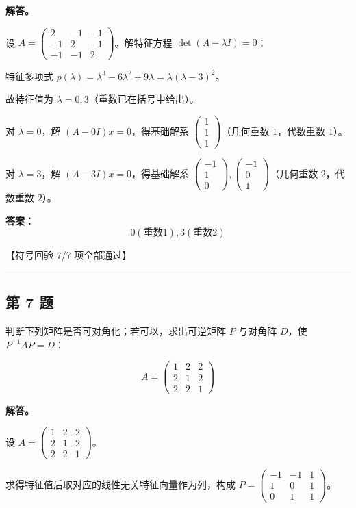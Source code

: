\documentclass[12pt, a4paper]{article}
\newcommand{\problem}[1]{\subsection*{第 #1 题}}
\newcommand{\solution}{\textbf{解答。}}
\begin{document}
\solution

设 $A = \begin{pmatrix} 2 & -1 & -1 \\ -1 & 2 & -1 \\ -1 & -1 & 2 \end{pmatrix}$。解特征方程 $\det(A - \lambda I) = 0$：

特征多项式 $p(\lambda) = \lambda^{3} - 6 \lambda^{2} + 9 \lambda = \lambda \left(\lambda - 3\right)^{2}$。

故特征值为 $\lambda = 0, 3$（重数已在括号中给出）。

对 $\lambda = 0$，解 $(A - 0I)x = 0$，得基础解系 $\begin{pmatrix} 1 \\ 1 \\ 1 \end{pmatrix}$（几何重数 $1$，代数重数 $1$）。

对 $\lambda = 3$，解 $(A - 3I)x = 0$，得基础解系 $\begin{pmatrix} -1 \\ 1 \\ 0 \end{pmatrix}, \begin{pmatrix} -1 \\ 0 \\ 1 \end{pmatrix}$（几何重数 $2$，代数重数 $2$）。

\textbf{答案：}
\[\boxed{0(重数1), 3(重数2)}\]

\textcolor{okgreen}{【符号回验 7/7 项全部通过】}

\vspace{0.8em}
\hrule
\vspace{0.8em}

\problem{7}

判断下列矩阵是否可对角化；若可以，求出可逆矩阵 $P$ 与对角阵 $D$，使 $P^{-1}AP = D$：

$$
A = \begin{pmatrix} 1 & 2 & 2 \\ 2 & 1 & 2 \\ 2 & 2 & 1 \end{pmatrix}
$$

\solution

设 $A = \begin{pmatrix} 1 & 2 & 2 \\ 2 & 1 & 2 \\ 2 & 2 & 1 \end{pmatrix}$。

求得特征值后取对应的线性无关特征向量作为列，构成 $P = \begin{pmatrix} -1 & -1 & 1 \\ 1 & 0 & 1 \\ 0 & 1 & 1 \end{pmatrix}$。
\end{document}
